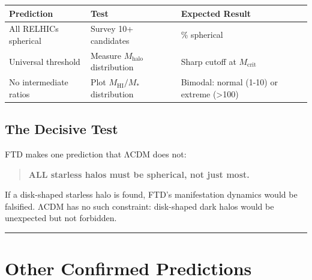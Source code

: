 \documentclass[
  11pt,
  letterpaper,
  twoside,
  openany]{book}
\makeatletter
\let\orig@section\section
\renewcommand{\section}{\needspace{8\baselineskip}\orig@section}
\let\orig@subsection\subsection
\renewcommand{\subsection}{\needspace{6\baselineskip}\orig@subsection}
\makeatother
\begin{document}
\begin{longtable}[]{@{}
  >{\raggedright\arraybackslash}p{}
  >{\raggedright\arraybackslash}p{}
  >{\raggedright\arraybackslash}p{}@{}}
\toprule\noalign{}
\begin{minipage}[b]{\linewidth}\raggedright
Prediction
\end{minipage} & \begin{minipage}[b]{\linewidth}\raggedright
Test
\end{minipage} & \begin{minipage}[b]{\linewidth}\raggedright
Expected Result
\end{minipage} \\
\midrule\noalign{}
\endhead
\bottomrule\noalign{}
\endlastfoot
All RELHICs spherical & Survey 10+ candidates & 100\% spherical \\
Universal threshold & Measure \(M_{\text{halo}}\) distribution & Sharp
cutoff at \(M_{\text{crit}}\) \\
No intermediate ratios & Plot \(M_{\text{HI}}/M_*\) distribution &
Bimodal: normal (1-10) or extreme (\textgreater100) \\
\end{longtable}

\subsection{The Decisive Test}\label{the-decisive-test}

FTD makes one prediction that ΛCDM does not:

\begin{quote}
\textbf{ALL starless halos must be spherical, not just most.}
\end{quote}

If a disk-shaped starless halo is found, FTD's manifestation dynamics
would be falsified. ΛCDM has no such constraint: disk-shaped dark halos
would be unexpected but not forbidden.

\begin{center}\rule{0.5\linewidth}{0.5pt}\end{center}

\section{Other Confirmed Predictions}\label{sec-other-confirmed}
\end{document}

